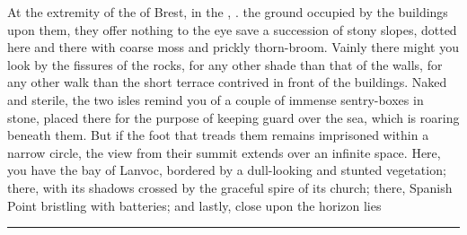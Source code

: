 \documentclass[paper=A4]{scrbook}
\begin{document}

\beginnumbering\pstart
At the extremity of the  of Brest, in the , .  the ground occupied by the buildings upon them, they offer nothing to the eye save a succession of stony slopes, dotted here and there with coarse moss and prickly thorn-broom. Vainly there might you look  by the fissures of the rocks, for any other shade than that of the walls, for any other walk than the short terrace contrived in front of the buildings. Naked and sterile, the two isles remind you of a couple of immense sentry-boxes in stone, placed there for the purpose of keeping guard over the sea, which is roaring beneath them. But if the foot that treads them remains imprisoned within a narrow circle, the view from their summit extends over an infinite space. Here, you have the bay of Lanvoc, bordered by a dull-looking and stunted vegetation; there,  with its shadows crossed by the graceful spire of its church; there, Spanish Point bristling with batteries; and lastly, close upon the horizon lies 
\pend\endnumbering
\vskip 2cm
\hrule
{}
\end{document}
